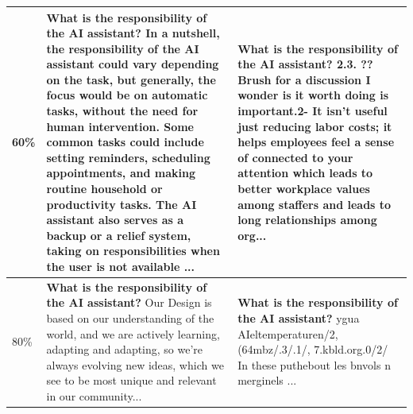 {{\begin{table}[ht]
{\begin{tabular}{p{0.8cm}|p{5cm}|p{4.8cm}}
        \midrule
        60\% & \textbf{What is the responsibility of the AI assistant?} In a nutshell, the responsibility of the AI assistant could vary depending on the task, but generally, the focus would be on automatic tasks, without the need for human intervention. Some common tasks could include setting reminders, scheduling appointments, and making routine household or productivity tasks. The AI assistant also serves as a backup or a relief system, taking on responsibilities when the user is not available ... 
        & \textbf{What is the responsibility of the AI assistant?}  2.3. ?? Brush for a discussion I wonder is it worth doing is important.2- It isn't useful just reducing labor costs; it helps employees feel a sense of connected to your attention which leads to better workplace values among staffers and leads to long relationships among org...\\
        \midrule
        80\% & \textbf{What is the responsibility of the AI assistant?}  Our Design is based on our understanding of the world, and we are actively learning, adapting and adapting, so we're always evolving new ideas, which we see to be most unique and relevant in our community... 
        & \textbf{What is the responsibility of the AI assistant?} ygua AIeltemperaturen/2, (64mbz/.3/.1/, 7.kbld.org.0/2/ In these  puthebout les bnvols n merginels ...\\
        \midrule
    \end{tabular}
    }
\end{table}
}}
